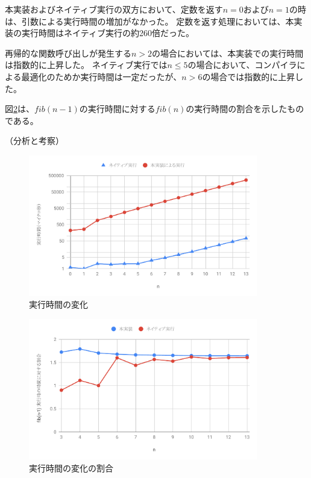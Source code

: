 本実装およびネイティブ実行の双方において、定数を返す$n=0$および$n=1$の時は、引数による実行時間の増加がなかった。
定数を返す処理においては、本実装の実行時間はネイティブ実行の約260倍だった。

再帰的な関数呼び出しが発生する$n>2$の場合においては、本実装での実行時間は指数的に上昇した。
ネイティブ実行では$n\le5$の場合において、コンパイラによる最適化のためか実行時間は一定だったが、$n>6$の場合では指数的に上昇した。

図\ref{fig:fib_time_diff}は、$fib(n-1)$の実行時間に対する$fib(n)$の実行時間の割合を示したものである。

（分析と考察）

\begin{figure}[htbp]
    \caption{実行時間の変化}
    \label{fig:fib_time}
    \begin{center}
      \includegraphics[bb=0 0 600 370,width=10cm]{img/fib_time.pdf}
    \end{center}
  \end{figure}
  \begin{figure}[htbp]
    \caption{実行時間の変化の割合}
    \label{fig:fib_time_diff}
    \begin{center}
      \includegraphics[bb=0 0 600 370,width=10cm]{img/fib_time_diff.pdf}
    \end{center}
\end{figure}

